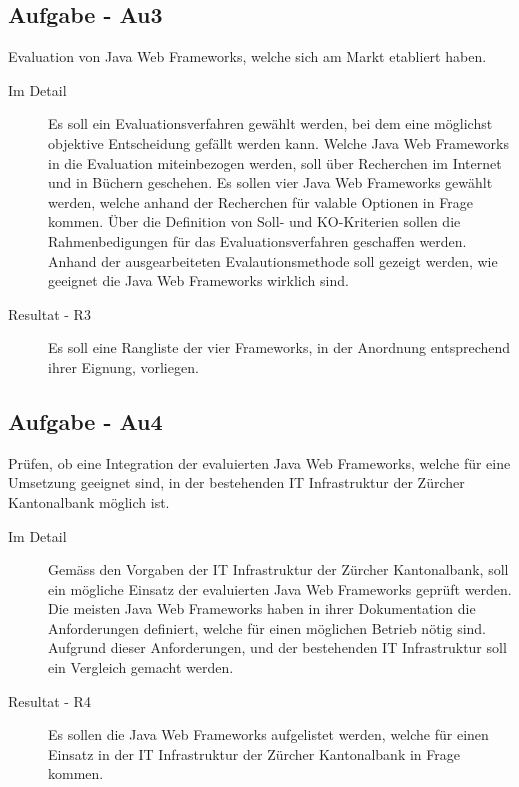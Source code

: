   \subsection{Aufgabe - Au3\label{itm:Aufgabe-03}}

  \begin{itshape}Evaluation von Java Web Frameworks, welche sich am Markt
  etabliert haben.\end{itshape}
  
  \begin{description}
    \item[Im Detail\label{itm:Detail-03}]
    Es soll ein Evaluationsverfahren gewählt werden, bei dem eine möglichst
    objektive Entscheidung gefällt werden kann. Welche Java Web Frameworks in
    die Evaluation miteinbezogen werden, soll über Recherchen im Internet und in
    Büchern geschehen. Es sollen vier Java Web Frameworks gewählt werden, welche
    anhand der Recherchen für valable Optionen in Frage kommen. Über die
    Definition von Soll- und KO-Kriterien sollen die Rahmenbedigungen für das
    Evaluationsverfahren geschaffen werden. Anhand der ausgearbeiteten
    Evalautionsmethode soll gezeigt werden, wie geeignet die Java Web Frameworks
    wirklich sind.
    \item[Resultat - R3\label{itm:Resultat-03}]
    Es soll eine Rangliste der vier Frameworks, in der Anordnung entsprechend
    ihrer Eignung, vorliegen.
  \end{description}
  
  \subsection{Aufgabe - Au4\label{itm:Aufgabe-04}}

  \begin{itshape}Prüfen, ob eine Integration der evaluierten Java Web
    Frameworks, welche für eine Umsetzung geeignet sind, in der bestehenden IT
    Infrastruktur der Zürcher Kantonalbank möglich ist.\end{itshape}
  
  \begin{description}
    \item[Im Detail\label{itm:Detail-04}]
    Gemäss den Vorgaben der IT Infrastruktur der Zürcher Kantonalbank, soll ein
    mögliche Einsatz der evaluierten Java Web Frameworks geprüft werden. Die
    meisten Java Web Frameworks haben in ihrer Dokumentation die Anforderungen
    definiert, welche für einen möglichen Betrieb nötig sind. Aufgrund dieser
    Anforderungen, und der bestehenden IT Infrastruktur soll ein Vergleich
    gemacht werden.
    \item[Resultat - R4\label{itm:Resultat-04}]
    Es sollen die Java Web Frameworks aufgelistet werden, welche für einen
    Einsatz in der IT Infrastruktur der Zürcher Kantonalbank in Frage kommen.
  \end{description}

